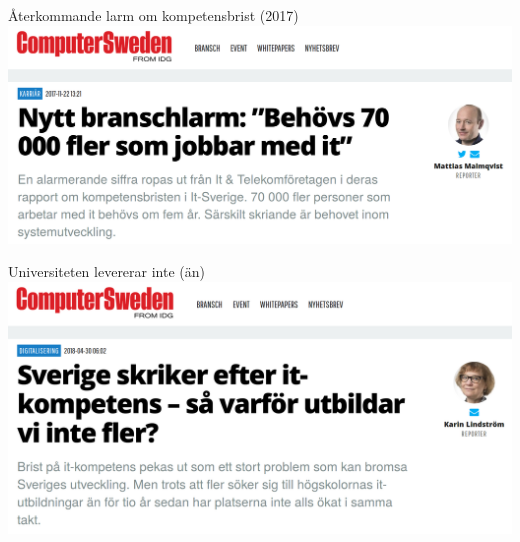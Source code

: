 \documentclass[aspectratio=169]{beamer}
\newenvironment{Slide}[1]%
  {\begin{frame}[environment=Slide]{#1}}
  {\end{frame}}%
\begin{document}
\begin{Slide}{Återkommande larm om kompetensbrist (2017)}
\includegraphics[height=0.75\textheight]{../img/kompetenslarm-cs}
\end{Slide}




\begin{Slide}{Universiteten levererar inte (än)}
\includegraphics[height=0.75\textheight]{../img/utbilda-fler}
\end{Slide}
\end{document}

